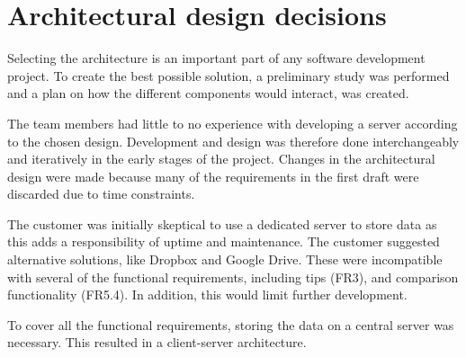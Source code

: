 \section{Architectural design decisions}
\label{sec:arch_design}
Selecting the architecture is an important part of any software development project. To create the best possible solution, a preliminary study was performed and a plan on how the different components would interact, was created. 

The team members had little to no experience with developing a server according to the chosen design. Development and design was therefore done interchangeably and iteratively in the early stages of the project. Changes in the architectural design were made because many of the requirements in the first draft were discarded due to time constraints. 

The customer was initially skeptical to use a dedicated server to store data as this adds a responsibility of uptime and maintenance. The customer suggested alternative solutions, like Dropbox and Google Drive.
These were incompatible with several of the functional requirements, including tips (FR3), and comparison functionality (FR5.4). In addition, this would limit further development. 

To cover all the functional requirements, storing the data on a central server was necessary. This resulted in a client-server architecture. 